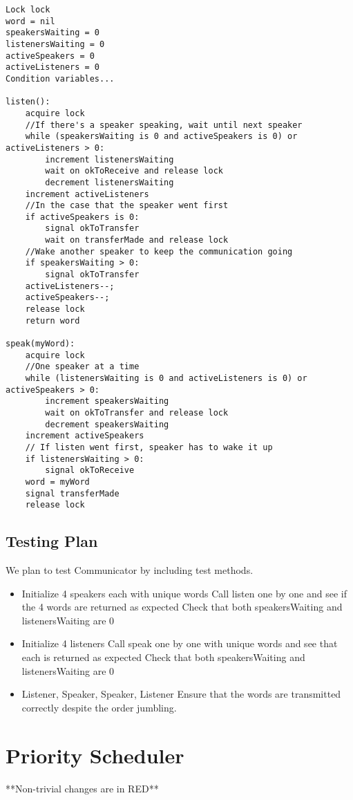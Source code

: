 \documentclass{article}
\begin{document}
\scriptsize
\begin{lstlisting}
Lock lock
word = nil
speakersWaiting = 0
listenersWaiting = 0
activeSpeakers = 0
activeListeners = 0
Condition variables...

listen():
    acquire lock
    //If there's a speaker speaking, wait until next speaker
    while (speakersWaiting is 0 and activeSpeakers is 0) or activeListeners > 0:
        increment listenersWaiting
        wait on okToReceive and release lock
        decrement listenersWaiting
    increment activeListeners
    //In the case that the speaker went first
    if activeSpeakers is 0:
        signal okToTransfer
        wait on transferMade and release lock
    //Wake another speaker to keep the communication going
    if speakersWaiting > 0:
        signal okToTransfer
    activeListeners--;
    activeSpeakers--;
    release lock
    return word

speak(myWord):
    acquire lock
    //One speaker at a time
    while (listenersWaiting is 0 and activeListeners is 0) or activeSpeakers > 0:
        increment speakersWaiting
        wait on okToTransfer and release lock
        decrement speakersWaiting
    increment activeSpeakers
    // If listen went first, speaker has to wake it up
    if listenersWaiting > 0:
        signal okToReceive
    word = myWord
    signal transferMade
    release lock
\end{lstlisting}
\normalsize

\subsection{Testing Plan}
We plan to test Communicator by including test methods.
\begin{itemize}
\item Initialize 4 speakers each with unique words
\subitem Call listen one by one and see if the 4 words are returned as expected
\subitem Check that both speakersWaiting and listenersWaiting are 0
\item Initialize 4 listeners
\subitem Call speak one by one with unique words and see that each is returned as expected
\subitem Check that both speakersWaiting and listenersWaiting are 0
\item Listener, Speaker, Speaker, Listener
\subitem Ensure that the words are transmitted correctly despite the order jumbling.
\end{itemize}

\section{Priority Scheduler}
\def \changecolor {BrickRed}
\large
**Non-trivial changes are in \textcolor{\changecolor}{RED}**
\normalsize
\end{document}
